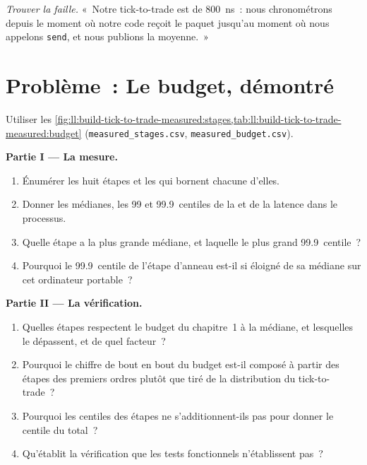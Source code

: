 \begin{exercise}[$\star\star\star$]\label{exo:ll:build-tick-to-trade-measured:8}
\emph{Trouver la faille.} «~Notre tick-to-trade est de \qty{800}{\nano\second}~: nous chronométrons depuis le moment où notre code reçoit le paquet jusqu'au
moment où nous appelons \texttt{send}, et nous publions la moyenne.~»
\end{exercise}

\section{Problème~: Le budget, démontré}

\begin{problem}\label{pb:ll:build-tick-to-trade-measured:1}
Utiliser les \cref{fig:ll:build-tick-to-trade-measured:stages,tab:ll:build-tick-to-trade-measured:budget} (\texttt{measured\_stages.csv},
\texttt{measured\_budget.csv}).

\medskip\noindent\textbf{Partie I --- La mesure.}
\begin{enumerate}
\item Énumérer les huit étapes et les  qui bornent chacune d'elles.
\item Donner les médianes, les 99 et 99.9~centiles de la  et de la latence dans le processus.
\item Quelle étape a la plus grande médiane, et laquelle le plus grand 99.9~centile~?
\item Pourquoi le 99.9~centile de l'étape d'anneau est-il si éloigné de sa médiane sur cet ordinateur portable~?
\end{enumerate}

\medskip\noindent\textbf{Partie II --- La vérification.}
\begin{enumerate}[resume]
\item Quelles étapes respectent le budget du chapitre~1 à la médiane, et lesquelles le dépassent, et de quel facteur~?
\item Pourquoi le chiffre de bout en bout du budget est-il composé à partir des étapes des premiers ordres plutôt que tiré de la
distribution du tick-to-trade~?
\item Pourquoi les centiles des étapes ne s'additionnent-ils pas pour donner le centile du total~?
\item Qu'établit la vérification que les tests fonctionnels n'établissent pas~?
\end{enumerate}


\end{problem}
